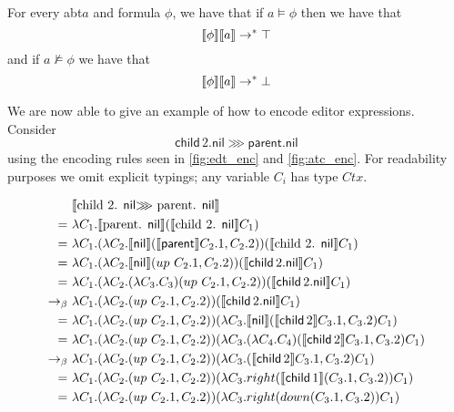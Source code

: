 \documentclass[sigplan]{acmart}
\newcommand{\abt}{\textsf{abt}\xspace}
\newcommand{\ec}[1]{\ensuremath{\textsf{#1}}\xspace}
\newcommand{\chld}{\ec{child}\,}
\newcommand{\parnt}{\ec{parent}}
\newcommand{\nil}{\ec{nil}}
\begin{document}
\begin{lemma}
  For every \abt $a$ and formula $\phi$, we have that if $a \models
  \phi$ then we have that
  \begin{equation}
    \label{eq:true}
    \llbracket \phi \rrbracket \llbracket a \rrbracket \rightarrow^{*} \top
  \end{equation}
  and if $a \not\models \phi$ we have that
  \begin{equation}
    \label{eq:false}
        \llbracket \phi \rrbracket \llbracket a \rrbracket \rightarrow^{*} \bot
  \end{equation}
\end{lemma}

\begin{example}
    We are now able to give an example of how to encode editor
    expressions. Consider
    \begin{equation*}
       \chld 2.\nil \ggg \parnt .\nil
    \end{equation*}
    using the encoding rules seen in \cref{fig:edt_enc} and
    \cref{fig:atc_enc}. For readability purposes we omit explicit
    typings;  any variable $C_i$ has type $Ctx$.
    \begin{small}
    \begin{align*}
         &\ \encode{\text{child\ $2$. \nil  $\ggg$ parent. \nil }} \\
         =&\ \lambda C_1 . \encode{\text{parent. \nil }} (\encode{\text{child\ $2$. \nil }} C_1) \\
         =&\ \lambda C_1 . (\lambda C_2 . \encode{\nil }(\encode{\parnt} C_2.1, C_2.2)) (\encode{\text{child\ $2$. \nil }} C_1) \\
         =&\ \lambda C_1 . (\lambda C_2 . \encode{\nil}(up\ C_2.1,
            C_2.2)) (\encode{\chld  2. \nil} C_1) \\
         =&\ \lambda C_1 . (\lambda C_2 . (\lambda C_3 . C_3)(up\ C_2.1, C_2.2)) (\encode{\chld  2. \nil } C_1) \\
         \betar&\ \lambda C_1 . (\lambda C_2 . (up\ C_2.1, C_2.2)) (\encode{\chld  2. \nil } C_1) \\
         =&\ \lambda C_1 . (\lambda C_2 . (up\ C_2.1, C_2.2)) (\lambda
            C_3 . \encode{ \nil} (\encode{\chld  2} C_3.1, C_3.2)C_1) \\
         =&\ \lambda C_1 . (\lambda C_2 . (up\ C_2.1, C_2.2)) (\lambda C_3 . (\lambda C_4.C_4) (\encode{\chld  2} C_3.1, C_3.2)C_1) \\
         \betar&\ \lambda C_1 . (\lambda C_2 . (up\ C_2.1, C_2.2)) (\lambda C_3 . (\encode{\chld  2} C_3.1, C_3.2)C_1) \\
         =&\ \lambda C_1 . (\lambda C_2 . (up\ C_2.1, C_2.2)) (\lambda C_3 . right (\encode{\chld  1} (C_3.1, C_3.2))C_1) \\
         =&\ \lambda C_1 . (\lambda C_2 . (up\ C_2.1, C_2.2)) (\lambda C_3 . right (down (C_3.1, C_3.2))C_1) \\
    \end{align*}
    \end{small}
\end{example}
\end{document}
